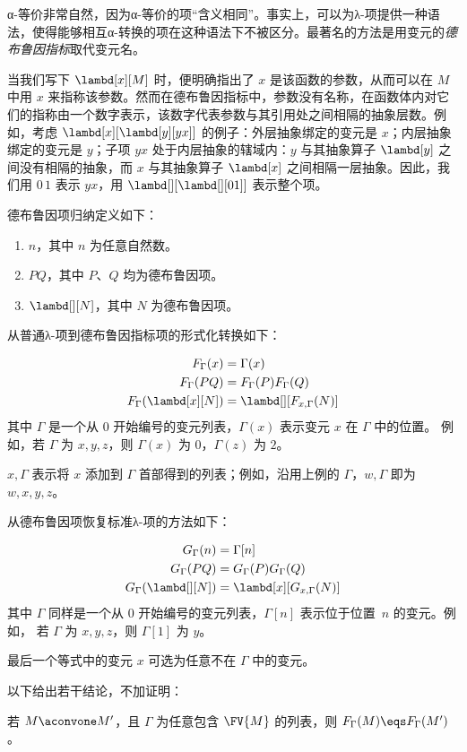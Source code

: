 \documentclass[../../../include/open-logic-section]{subfiles}
\begin{document}


α-等价非常自然，因为α-等价的项“含义相同”。事实上，可以为λ-项提供一种语法，使得能够相互α-转换的项在这种语法下不被区分。最著名的方法是用变元的\emph{德布鲁因指标}取代变元名。

当我们写下 $\lambd[x][M]$ 时，便明确指出了 $x$ 是该函数的参数，从而可以在 $M$ 中用 $x$ 来指称该参数。然而在德布鲁因指标中，参数没有名称，在函数体内对它们的指称由一个数字表示，该数字代表参数与其引用处之间相隔的抽象层数。例如，考虑 $\lambd[x][\lambd[y][y x]]$ 的例子：外层抽象绑定的变元是 $x$；内层抽象绑定的变元是 $y$；子项 $y x$ 处于内层抽象的辖域内：$y$ 与其抽象算子 $\lambd[y]$ 之间没有相隔的抽象，而 $x$ 与其抽象算子 $\lambd[x]$ 之间相隔一层抽象。因此，我们用 $0\, 1$ 表示 $y x$，用 $\lambd[][\lambd[][01]]$ 表示整个项。

\begin{defn}
  德布鲁因项归纳定义如下：
  \begin{enumerate}
  \item $n$，其中 $n$ 为任意自然数。
  \item $PQ$，其中 $P$、$Q$ 均为德布鲁因项。
  \item $\lambd[][N]$，其中 $N$ 为德布鲁因项。
  \end{enumerate}
\end{defn}

从普通λ-项到德布鲁因指标项的形式化转换如下：

\begin{defn}
  \begin{align*}
    F_\Gamma(x) &= \Gamma(x) \\
    F_\Gamma(PQ) &= F_\Gamma(P)F_\Gamma(Q) \\
    F_\Gamma(\lambd[x][N]) &= \lambd[][F_{x,\Gamma}(N)]
  \end{align*}
  其中 $\Gamma$ 是一个从 $0$ 开始编号的变元列表，$\Gamma(x)$ 表示变元 $x$ 在 $\Gamma$ 中的位置。
  例如，若 $\Gamma$ 为 $x,y,z$，则 $\Gamma(x)$ 为 $0$，$\Gamma(z)$ 为 $2$。

  $x,\Gamma$ 表示将 $x$ 添加到 $\Gamma$ 首部得到的列表；例如，沿用上例的 $\Gamma$，$w,\Gamma$ 即为 $w,x,y,z$。
\end{defn}

从德布鲁因项恢复标准λ-项的方法如下：

\begin{defn}
  \begin{align*}
    G_\Gamma(n) &= \Gamma[n] \\
    G_\Gamma(PQ) &= G_\Gamma(P) G_\Gamma(Q) \\
    G_\Gamma(\lambd[][N]) &= \lambd[x][G_{x,\Gamma}(N)]
  \end{align*}
  其中 $\Gamma$ 同样是一个从 $0$ 开始编号的变元列表，$\Gamma[n]$ 表示位于位置~$n$ 的变元。例如，
  若 $\Gamma$ 为 $x,y,z$，则 $\Gamma[1]$ 为 $y$。

  最后一个等式中的变元 $x$ 可选为任意不在 $\Gamma$ 中的变元。
\end{defn}

以下给出若干结论，不加证明：

\begin{prop}
  若 $M \aconvone M'$，且 $\Gamma$ 为任意包含 $\FV{M}$ 的列表，则
  $F_\Gamma(M) \eqs F_\Gamma(M')$。
\end{prop}
\end{document}

